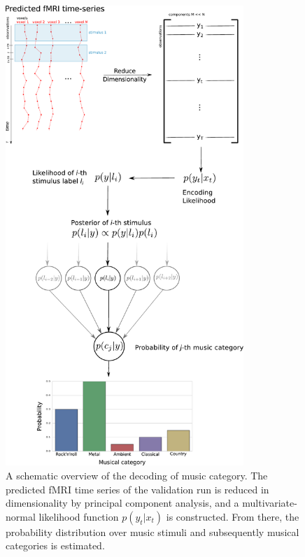 \begin{figure}
  \centering
  \includegraphics[width=9cm]{pics/Decoding_scheme}

  \caption{A schematic overview of the decoding of music category. The
    predicted f{MRI} time series of the validation run is reduced in
    dimensionality by principal component analysis, and a multivariate-normal
    likelihood function $p(y_{t}|x_{t})$ is constructed.  From there, the
  probability distribution over music stimuli and subsequently musical
categories is estimated.}


 \label{fig:decoding_scheme}
\end{figure}


